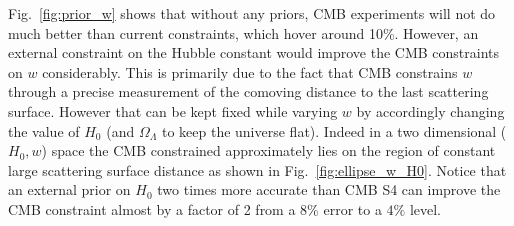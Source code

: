 \documentclass[aps,prd,reprint,superscriptaddress]{revtex4-1}
\newcommand{\reffig}[1]{Fig.~\ref{fig:#1}}
\begin{document}
\reffig{prior_w} shows that without any priors, CMB experiments will not do much better than current constraints, which hover around 10\%. However, an external constraint on the Hubble constant would improve the CMB constraints on $w$ considerably. 
This is primarily due to the fact that CMB constrains $w$ through a precise measurement of the comoving distance to the last scattering surface. However that can be kept fixed while varying $w$ by accordingly changing the value of $H_{0}$ (and $\Omega_{\Lambda}$ to keep the universe flat). Indeed in a two dimensional ($H_{0},w$) space the CMB constrained approximately lies on the region of constant large scattering surface distance as shown in \reffig{ellipse_w_H0}.
Notice that an external prior on $H_{0}$ two times more accurate than CMB S4 can improve the CMB constraint almost by a factor of 2 from a $8\%$ error to a $4\%$ level.
\end{document}
